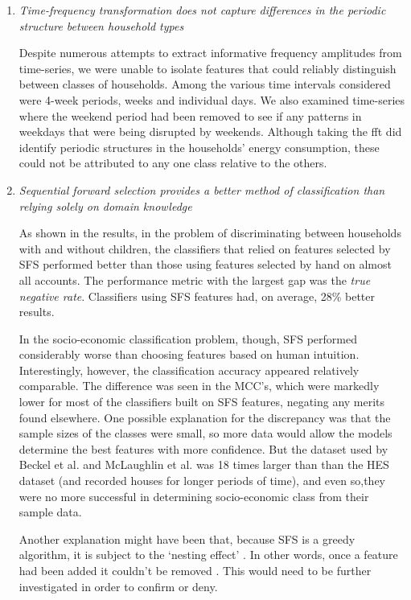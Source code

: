 \begin{enumerate}
\item \textit{Time-frequency transformation does not capture differences in the periodic structure between household types}

Despite numerous attempts to extract informative frequency amplitudes from time-series, we were unable to isolate features that could reliably distinguish between classes of households. Among the various time intervals considered were 4-week periods, weeks and individual days.   We also examined time-series where the weekend period had been removed to see if any patterns in weekdays that were being disrupted by weekends. Although taking the fft did identify periodic structures in the households' energy consumption, these could not be attributed to any one class relative to the others. 

\item \textit{Sequential forward selection provides a better method of classification than relying solely on domain knowledge}

As shown in the results, in the problem of discriminating between households with and without children, the classifiers that relied on features selected by SFS performed better than those using features selected by hand on almost all accounts. The performance metric with the largest gap was the \textit{true negative rate}. Classifiers using SFS features had, on average, 28\% better results. 

In the socio-economic classification problem, though, SFS performed considerably worse than choosing features based on human intuition.  Interestingly, however, the classification accuracy appeared relatively comparable.  The difference was seen in the MCC's, which were markedly lower for most of the classifiers built on SFS features, negating any merits found elsewhere. One possible explanation for the discrepancy was that the sample sizes of the classes were small, so more data would allow the models determine the best features with more confidence.  But the dataset used by Beckel et al. and McLaughlin et al. was 18 times larger than than the HES dataset (and recorded houses for longer periods of time), and even so,they were no more successful in determining socio-economic class from their sample data.
 
Another explanation might have been that, because SFS is a greedy algorithm, it is subject to the `nesting effect' .  In other words,  once a feature had been added it couldn't be removed \cite{Guyon}. This would need to be further investigated in order to confirm or deny.


\end{enumerate}
